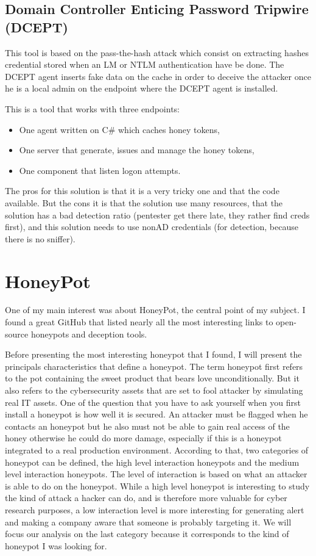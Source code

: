 \documentclass{tnreport}
\begin{document}
\subsection{Domain Controller Enticing Password Tripwire (DCEPT)\cite{lib10} \cite{lib11}}
This tool is based on the pass-the-hash attack which consist on extracting hashes credential stored when an LM or NTLM authentication have be done. The DCEPT agent inserts fake data on the cache in order to deceive the attacker once he is a local admin on the endpoint where the DCEPT agent is installed.  

This is a tool that works with three endpoints:
\begin{itemize}
    \item One agent written on C\# which caches honey tokens,
    \item One server that generate, issues and manage the honey tokens,
    \item One component that listen logon attempts.
\end{itemize}

The pros for this solution is that it is a very tricky one and that the code available. But the cons it is that the solution use many resources, that the solution has a bad detection ratio (pentester get there late, they rather find creds first), and this solution needs to use nonAD credentials (for detection, because there is no sniffer).

\section{HoneyPot}
One of my main interest was about HoneyPot, the central point of my subject. I found a great GitHub \cite{lib11} that listed nearly all the most interesting links to open-source honeypots and deception tools.


Before presenting the most interesting honeypot that I found, I will present the principals characteristics that define a honeypot.
The term honeypot first refers to the pot containing the sweet product that bears love unconditionally. But it also refers to the cybersecurity assets that are set to fool attacker by simulating real IT assets.
One of the question that you have to ask yourself when you first install a honeypot is how well it is secured. An attacker must be flagged when he contacts an honeypot but he also must not be able to gain real access of the honey otherwise he could do more damage, especially if this is a honeypot integrated to a real production environment.
According to that, two categories of honeypot can be defined, the high level interaction honeypots and the medium level interaction honeypots. The level of interaction is based on what an attacker is able to do on the honeypot. While a high level honeypot is interesting to study the kind of attack a hacker can do, and is therefore more valuable for cyber research purposes, a low interaction level is more interesting for generating alert and making a company aware that someone is probably targeting it. We will focus our analysis on the last category because it corresponds to the kind of honeypot I was looking for. 
\end{document}
